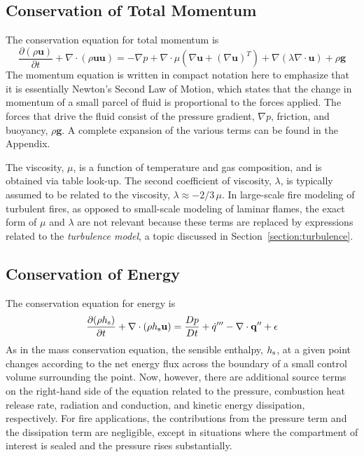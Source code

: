 \documentclass[graybox]{svmult}
\begin{document}
\subsection{Conservation of Total Momentum}

The conservation equation for total momentum is
\begin{equation}
\frac{\partial (\rho \mathbf{u})}{\partial t} + \nabla \cdot (\rho \mathbf{u} \mathbf{u}) = -\nabla p + \nabla \cdot \mu \left( \nabla \mathbf{u} + (\nabla \mathbf{u})^T \right) +  \nabla (\lambda \nabla \cdot \mathbf{u}) + \rho \mathbf{g}
\label{eq:momcon}
\end{equation}
The momentum equation is written in compact notation here to emphasize that it is essentially Newton's Second Law of Motion, which states that the change in momentum of a small parcel of fluid is proportional to the forces applied. The forces that drive the fluid consist of the pressure gradient, $\nabla p$, friction, and buoyancy, $\rho \mathbf{g}$. A complete expansion of the various terms can be found in the Appendix.

The viscosity, $\mu$, is a function of temperature and gas composition, and is obtained via table look-up. The second coefficient of viscosity, $\lambda$, is typically assumed to be related to the viscosity, $\lambda \approx -2/3 \, \mu$. In large-scale fire modeling of turbulent fires, as opposed to small-scale modeling of laminar flames, the exact form of $\mu$ and $\lambda$ are not relevant because these terms are replaced by expressions related to the {\em turbulence model}, a topic discussed in Section~\ref{section:turbulence}.

\subsection{Conservation of Energy}

The conservation equation for energy is
\begin{equation}
\frac{\partial (\rho h_{\rm s})}{\partial t} + \nabla \cdot (\rho h_{\rm s} \mathbf{u}) = \frac{Dp}{Dt} + \dot{q}''' - \nabla \cdot \mathbf{q}'' + \epsilon
\label{eq:encon}
\end{equation}
As in the mass conservation equation, the sensible enthalpy, $h_{\rm s}$, at a given point changes according to the net energy flux across the boundary of a small control volume surrounding the point. Now, however, there are additional source terms on the right-hand side of the equation related to the pressure, combustion heat release rate, radiation and conduction, and kinetic energy dissipation, respectively. For fire applications, the contributions from the pressure term and the dissipation term are negligible, except in situations where the compartment of interest is sealed and the pressure rises substantially.
\end{document}

